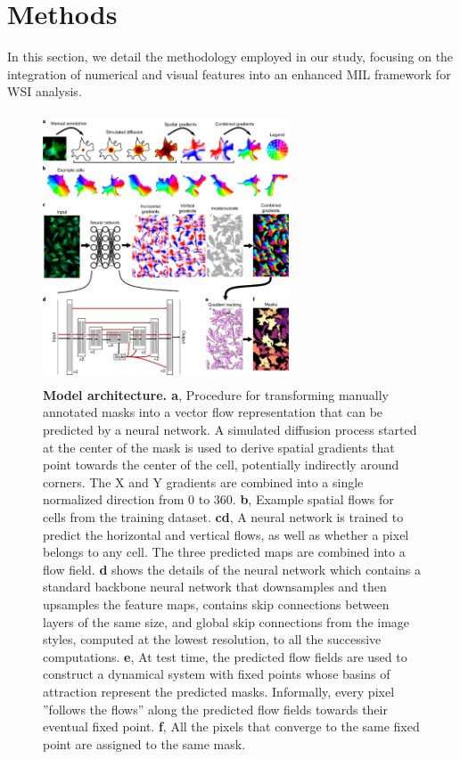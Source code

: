\documentclass[10pt,twocolumn]{article}
\begin{document}
\section{Methods} \label{methods}

In this section, we detail the methodology employed in our study, focusing on the integration of numerical and visual features into an enhanced MIL framework for WSI analysis.

\begin{figure}[!htb]
\centering
\includegraphics[width=0.65\textwidth, height=8cm]{images/cellpose.png}
\caption{\textbf{Model architecture. a}, Procedure for transforming manually annotated masks into a vector flow representation that can be predicted
by a neural network. A simulated diffusion process started at the center of the mask is used to derive spatial gradients that point towards the
center of the cell, potentially indirectly around corners. The X and Y gradients are combined into a single normalized direction from 0 to 360.
\textbf{b}, Example spatial flows for cells from the training dataset. \textbf{cd}, A neural network is trained to predict the horizontal and vertical flows, as well
as whether a pixel belongs to any cell. The three predicted maps are combined into a flow field. \textbf{d} shows the details of the neural network
which contains a standard backbone neural network that downsamples and then upsamples the feature maps, contains skip connections
between layers of the same size, and global skip connections from the image styles, computed at the lowest resolution, to all the successive
computations. \textbf{e}, At test time, the predicted flow fields are used to construct a dynamical system with fixed points whose basins of attraction
represent the predicted masks. Informally, every pixel ”follows the flows” along the predicted flow fields towards their eventual fixed point. \textbf{f}, All
the pixels that converge to the same fixed point are assigned to the same mask.} 
\label{cellpose}
\end{figure}
\end{document}

